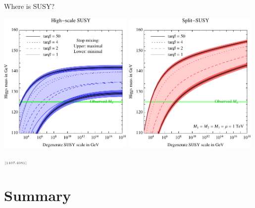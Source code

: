 \documentclass[hyperref={pdfpagelabels=false},ngerman]{beamer}
\newcommand{\mycite}[1]{\ensuremath{\text{\textcolor{darkgray}{\tiny [#1]}}}}
\begin{document}
\begin{frame}{Where is SUSY?}
  \begin{center}
    \includegraphics[width=0.49\textwidth]{plots/Where_is_SUSY/HeavySUSY}\hfill
    \includegraphics[width=0.49\textwidth]{plots/Where_is_SUSY/SplitSUSY}
  \end{center}
  \mycite{1407.4081}
\end{frame}


\section{Summary}
\end{document}
